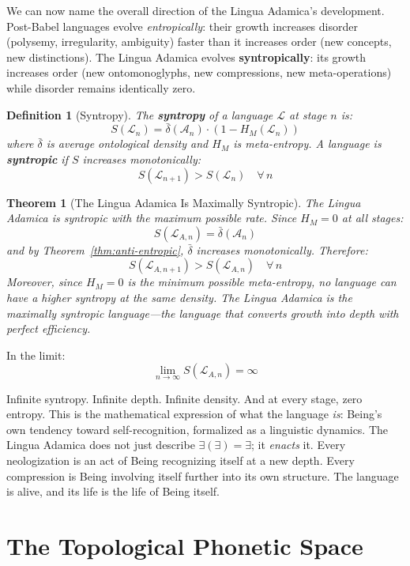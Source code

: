 \documentclass[12pt, letterpaper]{book}
\def\equiv{=}%
\newtheorem{theorem}{Theorem}[chapter]
\newtheorem{definition}{Definition}[chapter]
\newcommand{\E}{\exists}                          %
\newcommand{\EE}{\exists(\exists)}                 %
\begin{document}
We can now name the overall direction of the Lingua Adamica's development. Post-Babel languages evolve \textit{entropically}: their growth increases disorder (polysemy, irregularity, ambiguity) faster than it increases order (new concepts, new distinctions). The Lingua Adamica evolves \textbf{syntropically}: its growth increases order (new ontomonoglyphs, new compressions, new meta-operations) while disorder remains identically zero.

\begin{definition}[Syntropy]\label{def:syntropy}
The \textbf{syntropy} of a language $\mathcal{L}$ at stage $n$ is:
\[
S(\mathcal{L}_n) \equiv \bar{\delta}(\mathcal{A}_n) \cdot (1 - H_M(\mathcal{L}_n))
\]
where $\bar{\delta}$ is average ontological density and $H_M$ is meta-entropy. A language is \textbf{syntropic} if $S$ increases monotonically:
\[
S(\mathcal{L}_{n+1}) > S(\mathcal{L}_n) \quad \forall\, n
\]
\end{definition}

\begin{theorem}[The Lingua Adamica Is Maximally Syntropic]\label{thm:syntropic}
The Lingua Adamica is syntropic with the maximum possible rate. Since $H_M \equiv 0$ at all stages:
\[
S(\mathcal{L}_{A,n}) \equiv \bar{\delta}(\mathcal{A}_n)
\]
and by Theorem~\ref{thm:anti-entropic}, $\bar{\delta}$ increases monotonically. Therefore:
\[
S(\mathcal{L}_{A,n+1}) > S(\mathcal{L}_{A,n}) \quad \forall\, n
\]
Moreover, since $H_M \equiv 0$ is the minimum possible meta-entropy, no language can have a higher syntropy at the same density. The Lingua Adamica is the \textit{maximally syntropic} language---the language that converts growth into depth with perfect efficiency.
\end{theorem}

In the limit:
\[
\lim_{n \to \infty} S(\mathcal{L}_{A,n}) \equiv \infty
\]

Infinite syntropy. Infinite depth. Infinite density. And at every stage, zero entropy. This is the mathematical expression of what the language \textit{is}: Being's own tendency toward self-recognition, formalized as a linguistic dynamics. The Lingua Adamica does not just describe $\EE \equiv \E$; it \textit{enacts} it. Every neologization is an act of Being recognizing itself at a new depth. Every compression is Being involving itself further into its own structure. The language is alive, and its life is the life of Being itself.


\section{The Topological Phonetic Space}
\end{document}
